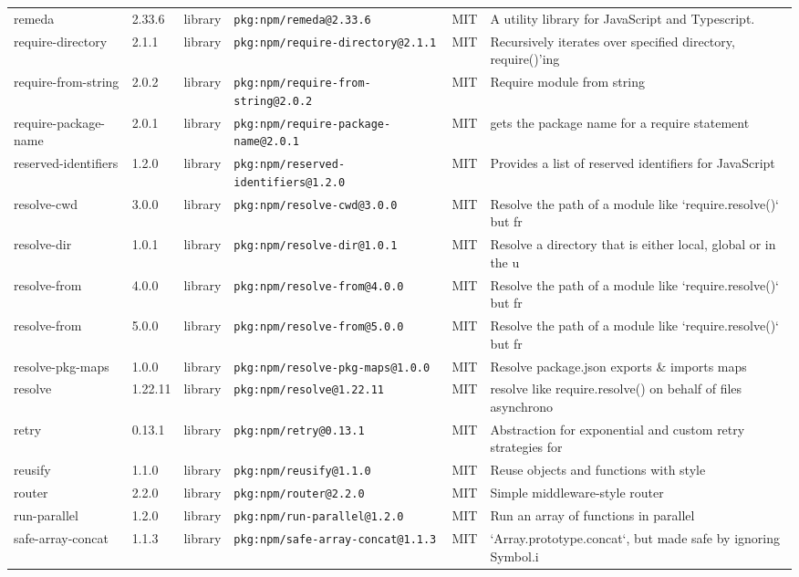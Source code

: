 \documentclass[11pt]{article}
\begin{document}
\begin{longtable}{|l|l|l|p{2.2cm}|l|p{4cm}|}
remeda & 2.33.6 & library & \texttt{pkg:npm/remeda@2.33.6} & MIT & A utility library for JavaScript and Typescript. \\
require-directory & 2.1.1 & library & \texttt{pkg:npm/require-directory@2.1.1} & MIT & Recursively iterates over specified directory, require()'ing \\
require-from-string & 2.0.2 & library & \texttt{pkg:npm/require-from-string@2.0.2} & MIT & Require module from string \\
require-package-name & 2.0.1 & library & \texttt{pkg:npm/require-package-name@2.0.1} & MIT & gets the package name for a require statement \\
reserved-identifiers & 1.2.0 & library & \texttt{pkg:npm/reserved-identifiers@1.2.0} & MIT & Provides a list of reserved identifiers for JavaScript \\
resolve-cwd & 3.0.0 & library & \texttt{pkg:npm/resolve-cwd@3.0.0} & MIT & Resolve the path of a module like `require.resolve()` but fr \\
resolve-dir & 1.0.1 & library & \texttt{pkg:npm/resolve-dir@1.0.1} & MIT & Resolve a directory that is either local, global or in the u \\
resolve-from & 4.0.0 & library & \texttt{pkg:npm/resolve-from@4.0.0} & MIT & Resolve the path of a module like `require.resolve()` but fr \\
resolve-from & 5.0.0 & library & \texttt{pkg:npm/resolve-from@5.0.0} & MIT & Resolve the path of a module like `require.resolve()` but fr \\
resolve-pkg-maps & 1.0.0 & library & \texttt{pkg:npm/resolve-pkg-maps@1.0.0} & MIT & Resolve package.json exports \& imports maps \\
resolve & 1.22.11 & library & \texttt{pkg:npm/resolve@1.22.11} & MIT & resolve like require.resolve() on behalf of files asynchrono \\
retry & 0.13.1 & library & \texttt{pkg:npm/retry@0.13.1} & MIT & Abstraction for exponential and custom retry strategies for  \\
reusify & 1.1.0 & library & \texttt{pkg:npm/reusify@1.1.0} & MIT & Reuse objects and functions with style \\
router & 2.2.0 & library & \texttt{pkg:npm/router@2.2.0} & MIT & Simple middleware-style router \\
run-parallel & 1.2.0 & library & \texttt{pkg:npm/run-parallel@1.2.0} & MIT & Run an array of functions in parallel \\
safe-array-concat & 1.1.3 & library & \texttt{pkg:npm/safe-array-concat@1.1.3} & MIT & `Array.prototype.concat`, but made safe by ignoring Symbol.i \\

\end{longtable}
\end{document}
